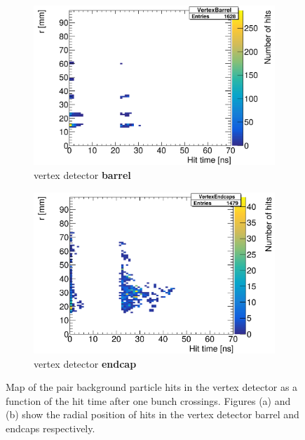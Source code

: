   \begin{figure}[htbp]
 \centering
  \begin{subfigure}[b]{0.49\textwidth}
   \centering
    \includegraphics[width=\textwidth]{Figures/Pairs/hittime_SiVertexBarrel.png}
   \caption{\sid vertex detector \textbf{barrel}}
   \end{subfigure}
   \hfill
    \begin{subfigure}[b]{0.49\textwidth}
   \centering
    \includegraphics[width=\textwidth]{Figures/Pairs/hittime_SiVertexEndcap.png}
   \caption{\sid vertex detector \textbf{endcap}}
   \end{subfigure}
   \caption[Pair background hit time maps in the \sid vertex detector]{Map of the pair background particle hits in the \sid vertex detector as a function of the hit time after one bunch crossings.
   Figures (a) and (b) show the radial position of hits in the vertex detector barrel and endcaps respectively.
   }
   \label{fig:PairBkg:Hittime}
 \end{figure}
 
